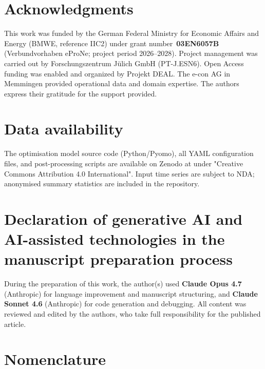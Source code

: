 \documentclass[a4paper,fleqn]{cas-dc}
\begin{document}
\section*{Acknowledgments}
This work was funded by the German Federal Ministry for Economic
Affairs and Energy (BMWE, reference IIC2) under grant
number~\textbf{03EN6057B} (Verbundvorhaben eProNe; project period 2026--2028).
Project management was carried out by Forschungszentrum J\"ulich
GmbH (PT-J.ESN6). Open Access funding was enabled and organized by Projekt DEAL. The e-con AG in
Memmingen provided operational data and domain expertise. The authors express their gratitude for the support provided. 

\section*{Data availability}

The optimisation  model source code (Python/Pyomo), all YAML
configuration files, and post-processing scripts are available on
Zenodo at \citet{ruess_2026_calion} under
"Creative Commons Attribution 4.0 International". Input time series are subject to NDA; anonymised summary
statistics are included in the repository.

\section*{Declaration of generative AI and AI-assisted technologies in the manuscript preparation process}

During the preparation of this work, the author(s) used
\textbf{Claude Opus 4.7} (Anthropic) for language improvement and
manuscript structuring, and \textbf{Claude Sonnet 4.6} (Anthropic)
for code generation and debugging.  All content was reviewed and
edited by the authors, who take full responsibility for the
published article.


\appendix
\newpage

\section{Nomenclature}
\label{app:nomenclature}
\end{document}
